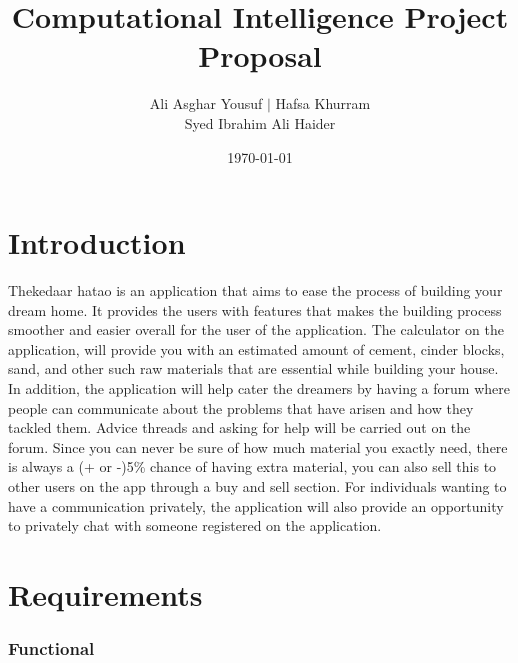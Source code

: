 \documentclass{article}
\title{Computational Intelligence Project Proposal}
\author{Ali Asghar Yousuf $\mid$ Hafsa Khurram\\
      Syed Ibrahim Ali Haider}
\date{\today}
\begin{document}
\maketitle

\section*{Introduction}

Thekedaar hatao is an application that aims to ease the process of building
your dream home. It provides the users with features that makes the building
process smoother and easier overall for the user of the application. The
calculator on the application, will provide you with an estimated amount of
cement, cinder blocks, sand, and other such raw materials that are essential
while building your house. In addition, the application will help cater the
dreamers by having a forum where people can communicate about the problems that
have arisen and how they tackled them. Advice threads and asking for help will
be carried out on the forum. Since you can never be sure of how much material
you exactly need, there is always a (+ or -)5\% chance of having extra
material, you can also sell this to other users on the app through a buy and
sell section. For individuals wanting to have a communication privately, the
application will also provide an opportunity to privately chat with someone
registered on the application.

\section*{Requirements}

\subsubsection*{Functional}
\end{document}
